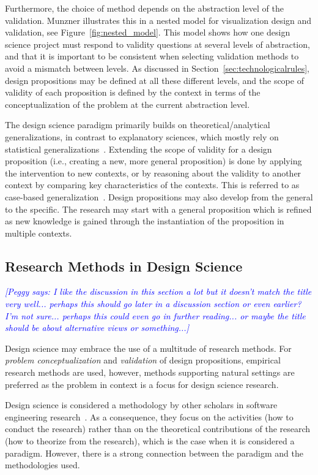 \documentclass[graybox]{svmult}
\newcommand{\peggy}[1]{\textcolor{blue}{{\it [Peggy says: #1]}}}
\newcommand{\peggy}[1]{}
\begin{document}
Furthermore, the choice of method depends on the abstraction level of the validation. Munzner illustrates this in a nested model for visualization design and validation, see Figure~\ref{fig:nested_model}. This model shows how one design science project must respond to validity questions at several levels of abstraction, and that it is important to be consistent when selecting validation methods to avoid a mismatch between levels. As discussed in Section~\ref{sec:technologicalrules}, design propositions may be defined at all these different levels, and the scope of validity of each proposition is defined by the context in terms of the conceptualization of the problem at the current abstraction level.

The design science paradigm primarily builds on theoretical/analytical generalizations, in contrast to explanatory sciences, which mostly rely on statistical generalizations~\cite[p. 30]{Runeson12Case}. Extending the scope of validity for a design proposition (i.e., creating a new, more general proposition) is done by applying the intervention to new contexts, or by reasoning about the validity to another context by comparing key characteristics of the contexts. This is referred to as case-based generalization~\cite{wieringa_six_2015}.  
Design propositions may also develop from the general to the specific. The research may start with a general proposition which is refined as new knowledge is gained through the instantiation of the proposition in multiple contexts. 


\subsection{Research Methods in Design Science} 
\peggy{I like the discussion in this section a lot but it doesn't match the title very well...  perhaps this should go later in a discussion section or even earlier? I'm not sure... perhaps this could even go in further reading... or maybe the title should be about alternative views or something...}

Design science may embrace the use of a multitude of research methods. For \emph{problem conceptualization} and \emph{validation} of design propositions, empirical research methods are used, however, methods supporting natural settings are preferred as the problem in context is a focus for design science research. 

Design science is considered a methodology by other scholars in software engineering research~\cite{Wohlin2015}. As a consequence, they focus on the %
activities (how to conduct the research) rather than on the theoretical contributions of the research (how to theorize from the research), which is the case when it is considered a paradigm. However, %
there is a strong connection between the paradigm and the methodologies used.%
\end{document}
